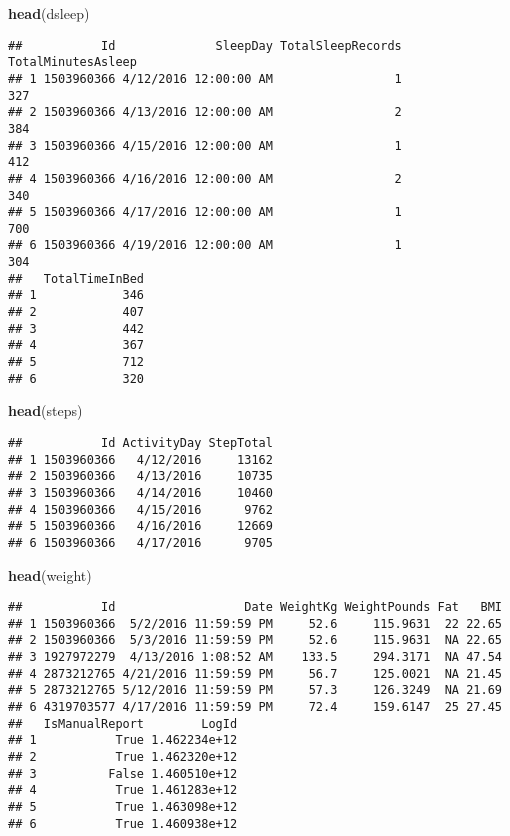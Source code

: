 \documentclass[
]{article}
\newenvironment{Shaded}{\begin{snugshade}}{\end{snugshade}}
\newcommand{\FunctionTok}[1]{\textcolor[rgb]{0.13,0.29,0.53}{\textbf{#1}}}
\newcommand{\NormalTok}[1]{#1}
\begin{document}
\begin{Shaded}
\begin{Highlighting}[]
\FunctionTok{head}\NormalTok{(dsleep)}
\end{Highlighting}
\end{Shaded}

\begin{verbatim}
##           Id              SleepDay TotalSleepRecords TotalMinutesAsleep
## 1 1503960366 4/12/2016 12:00:00 AM                 1                327
## 2 1503960366 4/13/2016 12:00:00 AM                 2                384
## 3 1503960366 4/15/2016 12:00:00 AM                 1                412
## 4 1503960366 4/16/2016 12:00:00 AM                 2                340
## 5 1503960366 4/17/2016 12:00:00 AM                 1                700
## 6 1503960366 4/19/2016 12:00:00 AM                 1                304
##   TotalTimeInBed
## 1            346
## 2            407
## 3            442
## 4            367
## 5            712
## 6            320
\end{verbatim}

\begin{Shaded}
\begin{Highlighting}[]
\FunctionTok{head}\NormalTok{(steps)}
\end{Highlighting}
\end{Shaded}

\begin{verbatim}
##           Id ActivityDay StepTotal
## 1 1503960366   4/12/2016     13162
## 2 1503960366   4/13/2016     10735
## 3 1503960366   4/14/2016     10460
## 4 1503960366   4/15/2016      9762
## 5 1503960366   4/16/2016     12669
## 6 1503960366   4/17/2016      9705
\end{verbatim}

\begin{Shaded}
\begin{Highlighting}[]
\FunctionTok{head}\NormalTok{(weight)}
\end{Highlighting}
\end{Shaded}

\begin{verbatim}
##           Id                  Date WeightKg WeightPounds Fat   BMI
## 1 1503960366  5/2/2016 11:59:59 PM     52.6     115.9631  22 22.65
## 2 1503960366  5/3/2016 11:59:59 PM     52.6     115.9631  NA 22.65
## 3 1927972279  4/13/2016 1:08:52 AM    133.5     294.3171  NA 47.54
## 4 2873212765 4/21/2016 11:59:59 PM     56.7     125.0021  NA 21.45
## 5 2873212765 5/12/2016 11:59:59 PM     57.3     126.3249  NA 21.69
## 6 4319703577 4/17/2016 11:59:59 PM     72.4     159.6147  25 27.45
##   IsManualReport        LogId
## 1           True 1.462234e+12
## 2           True 1.462320e+12
## 3          False 1.460510e+12
## 4           True 1.461283e+12
## 5           True 1.463098e+12
## 6           True 1.460938e+12
\end{verbatim}
\end{document}
